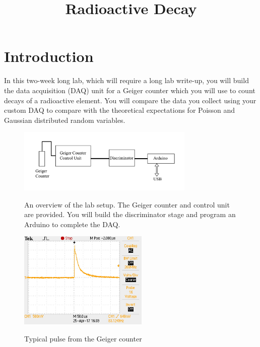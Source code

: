 \documentclass[12pt]{article}
\begin{document}


\title{Radioactive Decay}

\maketitle


\section{Introduction}

In this two-week long lab, which will require a long lab write-up, you
will build the data acquisition (DAQ) unit for a Geiger counter which you will use to count decays of a radioactive element.  You will compare the data you collect using your custom DAQ to compare
with the theoretical expectations for Poisson and Gaussian distributed
random variables.

\begin{figure}[htbp]
\begin{center}
{\includegraphics[width=0.75\textwidth]{figs/plan.pdf}}
\end{center}
\caption{\label{fig:plan} An overview of the lab setup.  The Geiger
  counter and control unit are provided.  You will build the
  discriminator stage and program an Arduino to complete the DAQ.}
\end{figure}

\begin{figure}[htbp]
\begin{center}
{\includegraphics[width=0.55\textwidth]{figs/geiger_pulse.jpg}}
\end{center}
\caption{\label{fig:geigerpulse} Typical pulse from the Geiger counter}
\end{figure}
\end{document}
